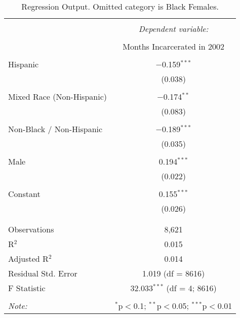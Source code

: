 
\begin{table}[!htbp] \centering 
  \caption{Regression Output. Omitted category is Black Females.} 
  \label{tab:regression} 
\begin{tabular}{@{\extracolsep{5pt}}lc} 
\\[-1.8ex]\hline 
\hline \\[-1.8ex] 
 & \multicolumn{1}{c}{\textit{Dependent variable:}} \\ 
\cline{2-2} 
\\[-1.8ex] & Months Incarcerated in 2002 \\ 
\hline \\[-1.8ex] 
 Hispanic & $-$0.159$^{***}$ \\ 
  & (0.038) \\ 
  & \\ 
 Mixed Race (Non-Hispanic) & $-$0.174$^{**}$ \\ 
  & (0.083) \\ 
  & \\ 
 Non-Black / Non-Hispanic & $-$0.189$^{***}$ \\ 
  & (0.035) \\ 
  & \\ 
 Male & 0.194$^{***}$ \\ 
  & (0.022) \\ 
  & \\ 
 Constant & 0.155$^{***}$ \\ 
  & (0.026) \\ 
  & \\ 
\hline \\[-1.8ex] 
Observations & 8,621 \\ 
R$^{2}$ & 0.015 \\ 
Adjusted R$^{2}$ & 0.014 \\ 
Residual Std. Error & 1.019 (df = 8616) \\ 
F Statistic & 32.033$^{***}$ (df = 4; 8616) \\ 
\hline 
\hline \\[-1.8ex] 
\textit{Note:}  & \multicolumn{1}{r}{$^{*}$p$<$0.1; $^{**}$p$<$0.05; $^{***}$p$<$0.01} \\ 
\end{tabular} 
\end{table} 
